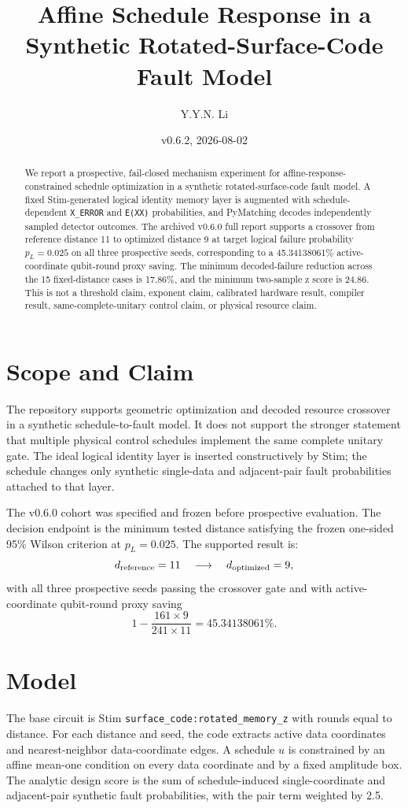 \documentclass[11pt]{article}
\title{Affine Schedule Response in a Synthetic Rotated-Surface-Code Fault Model}
\author{Y.Y.N. Li}
\date{v0.6.2, 2026-08-02}
\begin{document}
\maketitle

\begin{abstract}
We report a prospective, fail-closed mechanism experiment for affine-response-constrained schedule optimization in a synthetic rotated-surface-code fault model. A fixed Stim-generated logical identity memory layer is augmented with schedule-dependent \texttt{X\_ERROR} and \texttt{E(XX)} probabilities, and PyMatching decodes independently sampled detector outcomes. The archived v0.6.0 full report supports a crossover from reference distance 11 to optimized distance 9 at target logical failure probability $p_L=0.025$ on all three prospective seeds, corresponding to a 45.34138061\% active-coordinate qubit-round proxy saving. The minimum decoded-failure reduction across the 15 fixed-distance cases is 17.86\%, and the minimum two-sample z score is 24.86. This is not a threshold claim, exponent claim, calibrated hardware result, compiler result, same-complete-unitary control claim, or physical resource claim.
\end{abstract}

\section{Scope and Claim}
The repository supports geometric optimization and decoded resource crossover in a synthetic schedule-to-fault model. It does not support the stronger statement that multiple physical control schedules implement the same complete unitary gate. The ideal logical identity layer is inserted constructively by Stim; the schedule changes only synthetic single-data and adjacent-pair fault probabilities attached to that layer.

The v0.6.0 cohort was specified and frozen before prospective evaluation. The decision endpoint is the minimum tested distance satisfying the frozen one-sided 95\% Wilson criterion at $p_L=0.025$. The supported result is:
\[
  d_{\rm reference}=11 \quad\longrightarrow\quad d_{\rm optimized}=9,
\]
with all three prospective seeds passing the crossover gate and with active-coordinate qubit-round proxy saving
\[
  1 - \frac{161\times 9}{241\times 11} = 45.34138061\%.
\]

\section{Model}
The base circuit is Stim \texttt{surface\_code:rotated\_memory\_z} with rounds equal to distance. For each distance and seed, the code extracts active data coordinates and nearest-neighbor data-coordinate edges. A schedule $u$ is constrained by an affine mean-one condition on every data coordinate and by a fixed amplitude box. The analytic design score is the sum of schedule-induced single-coordinate and adjacent-pair synthetic fault probabilities, with the pair term weighted by 2.5.
\end{document}
